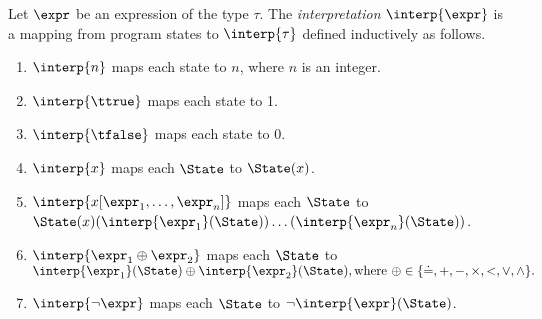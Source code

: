 \begin{definition}\label{def:boogie/interpret-expression}
Let $\expr$ be an expression of the type $\tau$. The \emph{interpretation} $\interp{\expr}$ is a mapping from program states to $\interp{\tau}$ defined inductively as follows.
\begin{enumerate}
  \item $\interp{n}$ maps each state to $n$, where $n$ is an integer.
  \item $\interp{\ttrue}$ maps each state to 1.
  \item $\interp{\tfalse}$ maps each state to 0.
  \item $\interp{x}$ maps each $\State$ to $\State(x)$.
  \item $\interp{x[\expr_1,\ldots,\expr_n]}$ maps each $\State$ to $\State(x)(\interp{\expr_1}(\State))\ldots(\interp{\expr_n}(\State))$.
  \item $\interp{\expr_1 \oplus \expr_2}$ maps each $\State$ to $\interp{\expr_1}(\State) \oplus \interp{\expr_2}(\State), \text{where } \oplus \in \{ \eql, +, -, \times, <, \vee, \wedge \}.$
  \item $\interp{\neg\expr}$ maps each $\State$ to $\neg\interp{\expr}(\State)$.\QED
\end{enumerate}
\end{definition}

